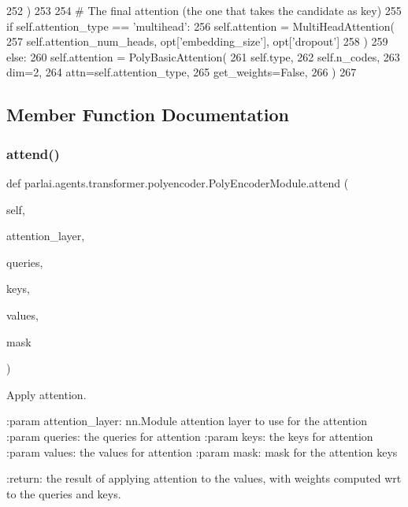 \begin{DoxyCode}
252                 )
253 
254         \textcolor{comment}{# The final attention (the one that takes the candidate as key)}
255         \textcolor{keywordflow}{if} self.attention\_type == \textcolor{stringliteral}{'multihead'}:
256             self.attention = MultiHeadAttention(
257                 self.attention\_num\_heads, opt[\textcolor{stringliteral}{'embedding\_size'}], opt[\textcolor{stringliteral}{'dropout'}]
258             )
259         \textcolor{keywordflow}{else}:
260             self.attention = PolyBasicAttention(
261                 self.type,
262                 self.n\_codes,
263                 dim=2,
264                 attn=self.attention\_type,
265                 get\_weights=\textcolor{keyword}{False},
266             )
267 
\end{DoxyCode}


\subsection{Member Function Documentation}
\mbox{\label{classparlai_1_1agents_1_1transformer_1_1polyencoder_1_1PolyEncoderModule_a21343cb181ee148326166a8e32e9e3d6}} 
\subsubsection{\texorpdfstring{attend()}{attend()}}
{\footnotesize\ttfamily def parlai.\+agents.\+transformer.\+polyencoder.\+Poly\+Encoder\+Module.\+attend (\begin{DoxyParamCaption}\item[{}]{self,  }\item[{}]{attention\+\_\+layer,  }\item[{}]{queries,  }\item[{}]{keys,  }\item[{}]{values,  }\item[{}]{mask }\end{DoxyParamCaption})}

\begin{DoxyVerb}Apply attention.

:param attention_layer:
    nn.Module attention layer to use for the attention
:param queries:
    the queries for attention
:param keys:
    the keys for attention
:param values:
    the values for attention
:param mask:
    mask for the attention keys

:return:
    the result of applying attention to the values, with weights computed
    wrt to the queries and keys.
\end{DoxyVerb}
 

